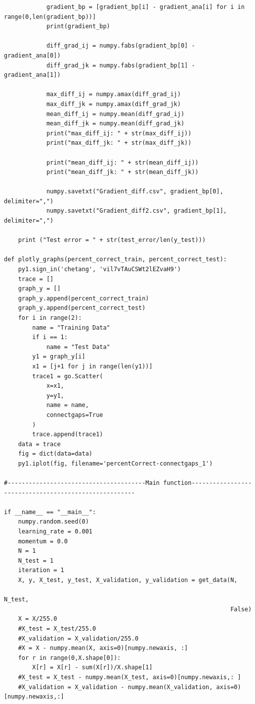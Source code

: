 \documentclass{article}
\begin{document}
\begin{lstlisting}
            gradient_bp = [gradient_bp[i] - gradient_ana[i] for i in range(0,len(gradient_bp))]
            print(gradient_bp)            
            
            diff_grad_ij = numpy.fabs(gradient_bp[0] - gradient_ana[0])
            diff_grad_jk = numpy.fabs(gradient_bp[1] - gradient_ana[1])

            max_diff_ij = numpy.amax(diff_grad_ij)
            max_diff_jk = numpy.amax(diff_grad_jk)    
            mean_diff_ij = numpy.mean(diff_grad_ij)
            mean_diff_jk = numpy.mean(diff_grad_jk)
            print("max_diff_ij: " + str(max_diff_ij))
            print("max_diff_jk: " + str(max_diff_jk))
            
            print("mean_diff_ij: " + str(mean_diff_ij))
            print("mean_diff_jk: " + str(mean_diff_jk))

            numpy.savetxt("Gradient_diff.csv", gradient_bp[0], delimiter=",")
            numpy.savetxt("Gradient_diff2.csv", gradient_bp[1], delimiter=",")
                
    print ("Test error = " + str(test_error/len(y_test)))
    
def plotly_graphs(percent_correct_train, percent_correct_test):
    py1.sign_in('chetang', 'vil7vTAuCSWt2lEZvaH9')
    trace = []
    graph_y = []
    graph_y.append(percent_correct_train)
    graph_y.append(percent_correct_test)
    for i in range(2):
        name = "Training Data"
        if i == 1:
            name = "Test Data"
        y1 = graph_y[i]
        x1 = [j+1 for j in range(len(y1))]
        trace1 = go.Scatter(
            x=x1,
            y=y1,
            name = name,
            connectgaps=True
        )
        trace.append(trace1)
    data = trace
    fig = dict(data=data)
    py1.iplot(fig, filename='percentCorrect-connectgaps_1')
        
#---------------------------------------Main function------------------------------------------------------
        
if __name__ == "__main__":     
    numpy.random.seed(0)
    learning_rate = 0.001
    momentum = 0.0
    N = 1
    N_test = 1
    iteration = 1
    X, y, X_test, y_test, X_validation, y_validation = get_data(N, 
                                                                N_test, 
                                                                False)
    X = X/255.0
    #X_test = X_test/255.0
    #X_validation = X_validation/255.0
    #X = X - numpy.mean(X, axis=0)[numpy.newaxis, :]
    for r in range(0,X.shape[0]):
        X[r] = X[r] - sum(X[r])/X.shape[1]
    #X_test = X_test - numpy.mean(X_test, axis=0)[numpy.newaxis,: ]
    #X_validation = X_validation - numpy.mean(X_validation, axis=0)[numpy.newaxis,:]
    

\end{lstlisting}
\end{document}
